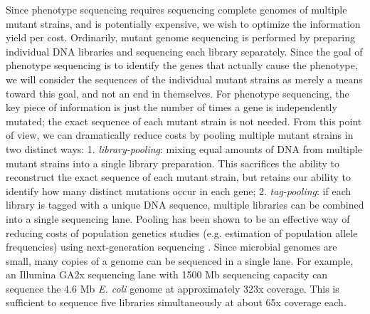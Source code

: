 \documentclass[letterpaper,10pt,english]{howto}
\begin{document}
Since phenotype sequencing requires sequencing complete genomes of
multiple mutant strains, and is potentially expensive, we wish
to optimize the information yield per cost.  Ordinarily,
mutant genome sequencing is performed by preparing individual
DNA libraries and sequencing each library separately.
Since the goal of phenotype sequencing is to identify
the genes that actually cause the phenotype, we will consider
the sequences of the individual mutant strains as merely
a means toward this goal, and not an end in themselves.
For phenotype sequencing, the key piece of information
is just the number of times a gene is independently mutated;
the exact sequence of each mutant strain is not needed.
From this point of view, we can dramatically reduce costs
by pooling multiple mutant strains in two distinct ways:
1. \emph{library-pooling}: mixing equal amounts of DNA from multiple mutant
strains into a single library preparation.  This sacrifices
the ability to reconstruct the exact sequence of each
mutant strain, but retains our ability to identify
how many distinct mutations occur in each gene;
2. \emph{tag-pooling}: if each library is tagged with a unique
DNA sequence, multiple libraries can be combined into a
single sequencing lane.  Pooling has been shown to
be an effective way of reducing costs of population
genetics studies (e.g. estimation of population
allele frequencies) using next-generation sequencing
\cite{Holt2009}  \cite{Cridland2010}  \cite{Futschik2010} .
Since microbial genomes are small,
many copies of a genome can be sequenced in a single lane.
For example, an
Illumina GA2x sequencing lane with 1500 Mb sequencing
capacity can sequence the 4.6 Mb \emph{E. coli} genome at
approximately 323x coverage.  This is sufficient to sequence
five libraries simultaneously at about 65x coverage each.
\end{document}
